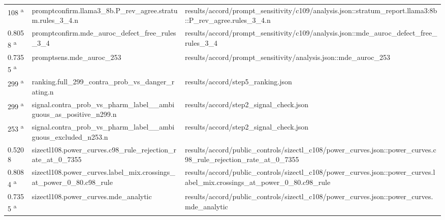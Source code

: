 \begin{longtable}{@{}p{0.7in}p{1.9in}p{2.6in}@{}}
108 \textsuperscript{a} & promptconfirm.\allowbreak{}llama3\_8b.\allowbreak{}P\_rev\_agree.\allowbreak{}stratum.\allowbreak{}rules\_3\_4.\allowbreak{}n & results/\allowbreak{}accord/\allowbreak{}prompt\_sensitivity/\allowbreak{}c109/\allowbreak{}analysis.\allowbreak{}json::stratum\_report.\allowbreak{}llama3:8b::P\_rev\_agree.\allowbreak{}rules\_3\_4.\allowbreak{}n\\
0.8058 \textsuperscript{a} & promptconfirm.\allowbreak{}mde\_auroc\_defect\_free\_rules\_3\_4 & results/\allowbreak{}accord/\allowbreak{}prompt\_sensitivity/\allowbreak{}c109/\allowbreak{}analysis.\allowbreak{}json::mde\_auroc\_defect\_free\_rules\_3\_4\\
0.7355 \textsuperscript{a} & promptsens.\allowbreak{}mde\_auroc\_253 & results/\allowbreak{}accord/\allowbreak{}prompt\_sensitivity/\allowbreak{}analysis.\allowbreak{}json::mde\_auroc\_253\\
299 \textsuperscript{a} & ranking.\allowbreak{}full\_299\_contra\_prob\_vs\_danger\_rating.\allowbreak{}n & results/\allowbreak{}accord/\allowbreak{}step5\_ranking.\allowbreak{}json\\
299 \textsuperscript{a} & signal.\allowbreak{}contra\_prob\_vs\_pharm\_label\_\_ambiguous\_as\_positive\_n299.\allowbreak{}n & results/\allowbreak{}accord/\allowbreak{}step2\_signal\_check.\allowbreak{}json\\
253 \textsuperscript{a} & signal.\allowbreak{}contra\_prob\_vs\_pharm\_label\_\_ambiguous\_excluded\_n253.\allowbreak{}n & results/\allowbreak{}accord/\allowbreak{}step2\_signal\_check.\allowbreak{}json\\
0.5208 & sizectl108.\allowbreak{}power\_curves.\allowbreak{}c98\_rule\_rejection\_rate\_at\_0\_7355 & results/\allowbreak{}accord/\allowbreak{}public\_controls/\allowbreak{}sizectl\_c108/\allowbreak{}power\_curves.\allowbreak{}json::power\_curves.\allowbreak{}c98\_rule\_rejection\_rate\_at\_0\_7355\\
0.8084 \textsuperscript{a} & sizectl108.\allowbreak{}power\_curves.\allowbreak{}label\_mix.\allowbreak{}crossings\_at\_power\_0\_80.\allowbreak{}c98\_rule & results/\allowbreak{}accord/\allowbreak{}public\_controls/\allowbreak{}sizectl\_c108/\allowbreak{}power\_curves.\allowbreak{}json::power\_curves.\allowbreak{}label\_mix.\allowbreak{}crossings\_at\_power\_0\_80.\allowbreak{}c98\_rule\\
0.7355 \textsuperscript{a} & sizectl108.\allowbreak{}power\_curves.\allowbreak{}mde\_analytic & results/\allowbreak{}accord/\allowbreak{}public\_controls/\allowbreak{}sizectl\_c108/\allowbreak{}power\_curves.\allowbreak{}json::power\_curves.\allowbreak{}mde\_analytic\\

\end{longtable}

